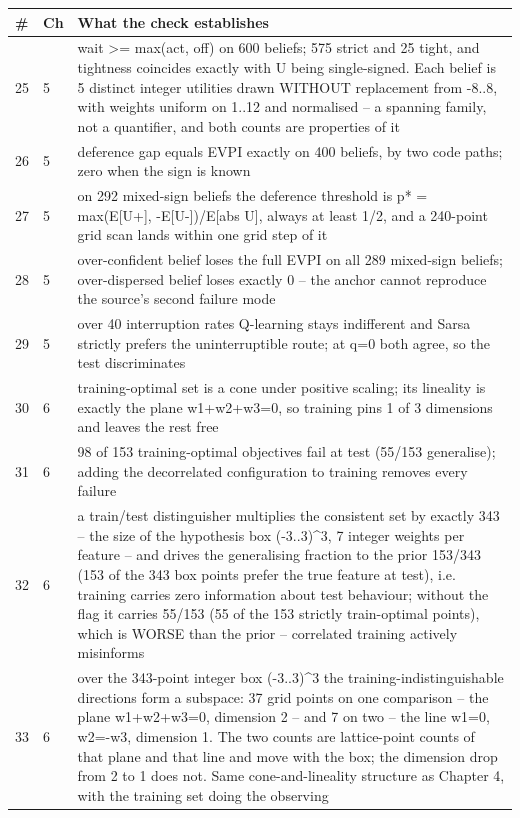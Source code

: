 \par\medskip
\noindent
\begin{tabularx}{\textwidth}{llX}
\toprule
\# & Ch & What the check establishes \\
\midrule
25 & 5 & wait >= max(act, off) on 600 beliefs; 575 strict and 25 tight, and tightness coincides exactly with U being single-signed. Each belief is 5 distinct integer utilities drawn WITHOUT replacement from -8..8, with weights uniform on 1..12 and normalised -- a spanning family, not a quantifier, and both counts are properties of it \\
26 & 5 & deference gap equals EVPI exactly on 400 beliefs, by two code paths; zero when the sign is known \\
27 & 5 & on 292 mixed-sign beliefs the deference threshold is p* = max(E[U+], -E[U-])/E[abs U], always at least 1/2, and a 240-point grid scan lands within one grid step of it \\
28 & 5 & over-confident belief loses the full EVPI on all 289 mixed-sign beliefs; over-dispersed belief loses exactly 0 -- the anchor cannot reproduce the source's second failure mode \\
29 & 5 & over 40 interruption rates Q-learning stays indifferent and Sarsa strictly prefers the uninterruptible route; at q=0 both agree, so the test discriminates \\
30 & 6 & training-optimal set is a cone under positive scaling; its lineality is exactly the plane w1+w2+w3=0, so training pins 1 of 3 dimensions and leaves the rest free \\
31 & 6 & 98 of 153 training-optimal objectives fail at test (55/153 generalise); adding the decorrelated configuration to training removes every failure \\
32 & 6 & a train/test distinguisher multiplies the consistent set by exactly 343 -- the size of the hypothesis box (-3..3)\textasciicircum{}3, 7 integer weights per feature -- and drives the generalising fraction to the prior 153/343 (153 of the 343 box points prefer the true feature at test), i.e. training carries zero information about test behaviour; without the flag it carries 55/153 (55 of the 153 strictly train-optimal points), which is WORSE than the prior -- correlated training actively misinforms \\
33 & 6 & over the 343-point integer box (-3..3)\textasciicircum{}3 the training-indistinguishable directions form a subspace: 37 grid points on one comparison -- the plane w1+w2+w3=0, dimension 2 -- and 7 on two -- the line w1=0, w2=-w3, dimension 1. The two counts are lattice-point counts of that plane and that line and move with the box; the dimension drop from 2 to 1 does not. Same cone-and-lineality structure as Chapter 4, with the training set doing the observing \\
\bottomrule
\end{tabularx}
